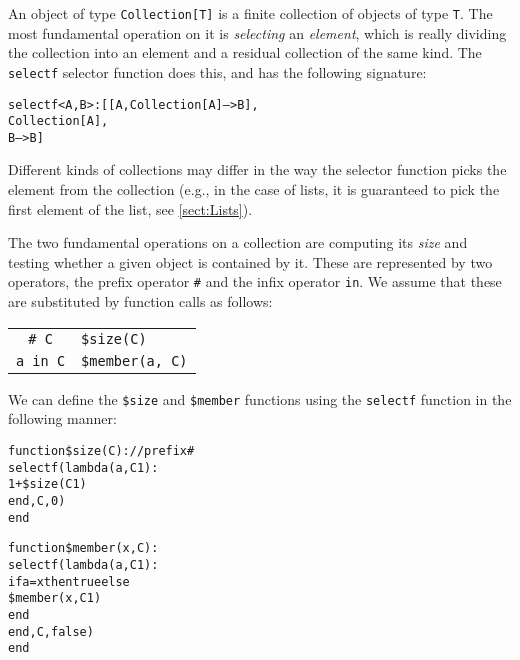 
An object of type {\tt Collection[T]} is a finite collection of
objects of type {\tt T}. The most fundamental operation on it is {\em
  selecting} an {\em element}, which is really dividing the collection
into an element and a residual collection of the same kind.
The {\tt selectf} selector function does this,
and has the following signature:


\begin{alltt}  selectf<A, B>: [[A, Collection[A] --> B], 
                  Collection[A], 
                  B --> B]
\end{alltt}

Different kinds of collections may differ in the way the selector
function picks the element from the collection (e.g., in the case of
lists, it is guaranteed to pick the first element of the list, see
\ref{sect:Lists}).

The two fundamental operations on a
collection are computing its {\em size} and testing whether a given
object is contained by it. These are represented by two operators, the
prefix operator {\tt \#} and the infix operator {\tt in}. We assume
that these are substituted by function calls as follows:


\begin{tabular}[h]{c@{~$\equiv$~}l}
  {\tt \# C} & {\tt \$size(C)}\\
  {\tt a in C} & {\tt \$member(a, C)}
\end{tabular}

We can define the {\tt \$size} and {\tt \$member} functions using the
{\tt selectf} function in the following manner:

\begin{alltt}function \$size(C) : // prefix \#
    selectf(lambda (a, C1) :
              1 + \$size(C1)
            end, C, 0)
end  

function \$member(x, C) :
    selectf(lambda (a, C1) :
                if a = x then true else 
                    \$member(x, C1)
                end
            end, C, false) 
end
\end{alltt}


